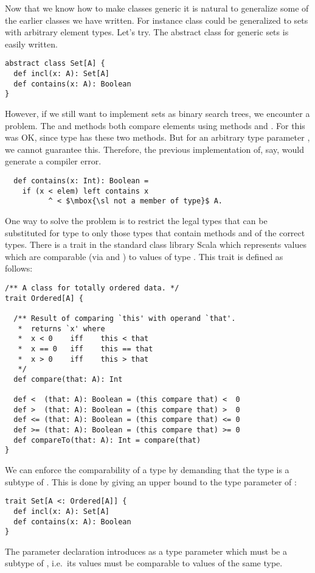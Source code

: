 Now that we know how to make classes generic it is natural to
generalize some of the earlier classes we have written. For instance
class  could be generalized to sets with arbitrary
element types. Let's try. The abstract class for generic sets is easily
written.
\begin{lstlisting}
abstract class Set[A] {
  def incl(x: A): Set[A]
  def contains(x: A): Boolean
}
\end{lstlisting}
However, if we still want to implement sets as binary search trees, we
encounter a problem. The  and  methods both
compare elements using methods \code{<} and \code{>}. For
 this was OK, since type  has these two
methods. But for an arbitrary type parameter , we cannot
guarantee this. Therefore, the previous implementation of, say,
 would generate a compiler error.
\begin{lstlisting}
  def contains(x: Int): Boolean =
    if (x < elem) left contains x
          ^ < $\mbox{\sl not a member of type}$ A.
\end{lstlisting}
One way to solve the problem is to restrict the legal types that can
be substituted for type  to only those types that contain methods
\code{<} and \code{>} of the correct types. There is a trait
 in the standard class library Scala which represents
values which are comparable (via \code{<} and \code{>}) to values of
type . This trait is defined as follows:
\begin{lstlisting}
/** A class for totally ordered data. */
trait Ordered[A] {

  /** Result of comparing `this' with operand `that'.
   *  returns `x' where
   *  x < 0    iff    this < that
   *  x == 0   iff    this == that
   *  x > 0    iff    this > that
   */
  def compare(that: A): Int

  def <  (that: A): Boolean = (this compare that) <  0
  def >  (that: A): Boolean = (this compare that) >  0
  def <= (that: A): Boolean = (this compare that) <= 0
  def >= (that: A): Boolean = (this compare that) >= 0
  def compareTo(that: A): Int = compare(that)
}
\end{lstlisting}
We can enforce the comparability of a type by demanding
that the type is a subtype of . This is done by giving an
upper bound to the type parameter of :
\begin{lstlisting}
trait Set[A <: Ordered[A]] {
  def incl(x: A): Set[A]
  def contains(x: A): Boolean
}
\end{lstlisting}
The parameter declaration  introduces  as a
type parameter which must be a subtype of , i.e.\ its values
must be comparable to values of the same type.

